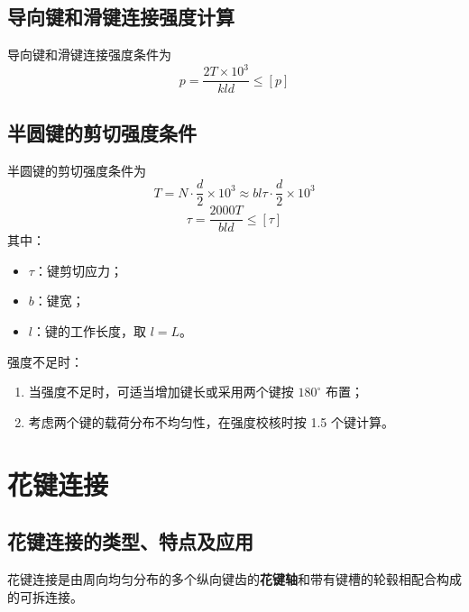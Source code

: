 \subsection{导向键和滑键连接强度计算}
\label{sec:导向键强度}

导向键和滑键连接强度条件为
\begin{equation}
	p=\frac{2T\times10^{3}}{kld}\le[p]
	\label{eq:轴毂:导向键比压}
\end{equation}

\subsection{半圆键的剪切强度条件}
\label{sec:半圆键强度}

半圆键的剪切强度条件为
\begin{equation}
	T=N\cdot\frac{d}{2}\times10^{3}\approx bl\tau\cdot\frac{d}{2}\times10^{3}
	\label{eq:轴毂:半圆键转矩}
\end{equation}
\begin{equation}
	\tau=\frac{2000T}{bld}\le[\tau]
	\label{eq:轴毂:半圆键剪切}
\end{equation}
其中：
\begin{itemize}
	\item $\tau$：键剪切应力；
	\item $b$：键宽；
	\item $l$：键的工作长度，取 $l=L$。
\end{itemize}

\begin{note}
强度不足时：
\begin{enumerate}
	\item 当强度不足时，可适当增加键长或采用两个键按 $180^{\circ}$ 布置；
	\item 考虑两个键的载荷分布不均匀性，在强度校核时按 1.5 个键计算。
\end{enumerate}
\end{note}

\section{花键连接}
\label{sec:花键连接}

\subsection{花键连接的类型、特点及应用}
\label{sec:花键类型}

花键连接是由周向均匀分布的多个纵向键齿的\textbf{花键轴}和带有键槽的轮毂相配合构成的可拆连接。

